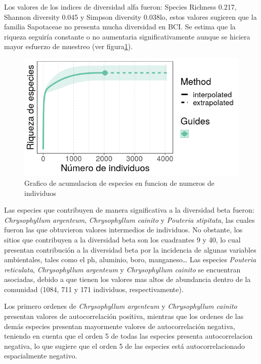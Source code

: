 \documentclass[11pt,]{article}
\begin{document}
Los valores de los indices de diversidad alfa fueron: Species Richness
0.217, Shannon diversity 0.045 y Simpson diversity 0.038lo, estos
valores sugieren que la familia Sapotaceae no presenta mucha diversidad
en BCI. Se estima que la riqueza seguiría constante o no aumentaria
significativamente aunque se hiciera mayor esfuerzo de muestreo (ver
figura\ref{fig:acumulacion_especies_individuos}).

\begin{figure}
\centering
\includegraphics{acumulacion_especies_individuos.png}
\caption{Grafico de acumulacion de especies en funcion de numeros de
individuos \label{fig:acumulacion_especies_individuos}}
\end{figure}

Las especies que contribuyen de manera significativa a la diversidad
beta fueron: \emph{Chrysophyllum argenteum}, \emph{Chrysophyllum
cainito} y \emph{Pouteria stipitata}, las cuales fueron las que
obtuvieron valores intermedios de individuos. No obstante, los sitios
que contribuyen a la diversidad beta son los cuadrantes 9 y 40, lo cual
presentan contribución a la diversidad beta por la incidencia de algunas
variables ambientales, tales como el ph, aluminio, boro,
manganeso\ldots{} Las especies \emph{Pouteria reticulata},
\emph{Chrysophyllum argenteum} y \emph{Chrysophyllum cainito} se
encuentran asociadas, debido a que tienen los valores mas altos de
abundancia dentro de la comunidad (1084, 711 y 171 individuos,
respectivamente).

Los primero ordenes de \emph{Chrysophyllum argenteum} y
\emph{Chrysophyllum cainito} presentan valores de autocorrelación
positiva, mientras que los ordenes de las demás especies presentan
mayormente valores de autocorrelación negativa, teniendo en cuenta que
el orden 5 de todas las especies presenta autocorrelacion negativa, lo
que sugiere que el orden 5 de las especies está autocorrelacionado
espacialmente negativo.
\end{document}
